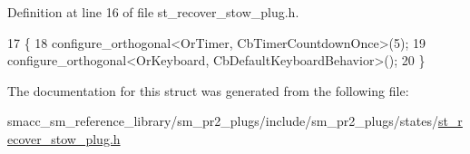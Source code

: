 Definition at line 16 of file st\+\_\+recover\+\_\+stow\+\_\+plug.\+h.


\begin{DoxyCode}
17     \{
18         configure\_orthogonal<OrTimer,  CbTimerCountdownOnce>(5);    
19         configure\_orthogonal<OrKeyboard, CbDefaultKeyboardBehavior>();
20     \}
\end{DoxyCode}


The documentation for this struct was generated from the following file\+:\begin{DoxyCompactItemize}
\item 
smacc\+\_\+sm\+\_\+reference\+\_\+library/sm\+\_\+pr2\+\_\+plugs/include/sm\+\_\+pr2\+\_\+plugs/states/\hyperlink{st__recover__stow__plug_8h}{st\+\_\+recover\+\_\+stow\+\_\+plug.\+h}\end{DoxyCompactItemize}
